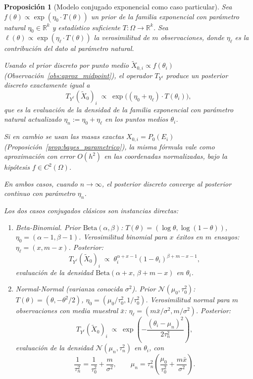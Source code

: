 ﻿\documentclass[12pt]{article}
\newtheorem{proposicion}{Proposición}[section]
\begin{document}
\begin{proposicion}[Modelo conjugado exponencial como caso particular]\label{prop:conjugado_exponencial_CI}
Sea $f(\theta)\propto\exp(\eta_0\cdot T(\theta))$ un prior de la familia exponencial con parámetro natural $\eta_0\in\mathbb{R}^k$ y estadístico suficiente $T:\Omega\to\mathbb{R}^k$. Sea $\ell(\theta)\propto\exp(\eta_\ell\cdot T(\theta))$ la verosimilitud de $m$ observaciones, donde $\eta_\ell$ es la contribución del dato al parámetro natural.

Usando el prior discreto por punto medio $\widetilde X_{0,i}\propto f(\theta_i)$ (Observación~\ref{obs:aprox_midpoint}), el operador $T_{Y^\ell}$ produce un posterior discreto \emph{exactamente} igual a
\[
T_{Y^\ell}(\widetilde X_0)_i
\;\propto\;
\exp\!\bigl((\eta_0+\eta_\ell)\cdot T(\theta_i)\bigr),
\]
que es la evaluación de la densidad de la familia exponencial con parámetro natural actualizado $\eta_n := \eta_0 + \eta_\ell$ en los puntos medios $\theta_i$.

Si en cambio se usan las masas exactas $X_{0,i}=P_0(E_i)$ (Proposición~\ref{prop:bayes_parametrico}), la misma fórmula vale como aproximación con error $O(h^2)$ en las coordenadas normalizadas, bajo la hipótesis $f\in C^2(\Omega)$.

En ambos casos, cuando $n\to\infty$, el posterior discreto converge al posterior continuo con parámetro $\eta_n$.

Los dos casos conjugados clásicos son instancias directas:
\begin{enumerate}[label=\textnormal{(\roman*)}]
    \item \emph{Beta-Binomial.} Prior $\mathrm{Beta}(\alpha,\beta)$: $T(\theta)=(\log\theta,\log(1-\theta))$, $\eta_0=(\alpha-1,\beta-1)$. Verosimilitud binomial para $x$ éxitos en $m$ ensayos: $\eta_\ell=(x,m-x)$. Posterior:
    \[
    T_{Y^\ell}(\widetilde X_0)_i \;\propto\; \theta_i^{\alpha+x-1}(1-\theta_i)^{\beta+m-x-1},
    \]
    evaluación de la densidad $\mathrm{Beta}(\alpha+x,\,\beta+m-x)$ en $\theta_i$.

    \item \emph{Normal-Normal} (varianza conocida $\sigma^2$). Prior $\mathcal{N}(\mu_0,\tau_0^2)$: $T(\theta)=(\theta,-\theta^2/2)$, $\eta_0=(\mu_0/\tau_0^2,1/\tau_0^2)$. Verosimilitud normal para $m$ observaciones con media muestral $\bar x$: $\eta_\ell=(m\bar x/\sigma^2,m/\sigma^2)$. Posterior:
    \[
    T_{Y^\ell}(\widetilde X_0)_i \;\propto\; \exp\!\left(-\frac{(\theta_i-\mu_n)^2}{2\tau_n^2}\right),
    \]
    evaluación de la densidad $\mathcal{N}(\mu_n,\tau_n^2)$ en $\theta_i$, con
    \[
    \frac{1}{\tau_n^2}=\frac{1}{\tau_0^2}+\frac{m}{\sigma^2},
    \qquad
    \mu_n=\tau_n^2\!\left(\frac{\mu_0}{\tau_0^2}+\frac{m\bar x}{\sigma^2}\right).
    \]
\end{enumerate}
\end{proposicion}
\end{document}
